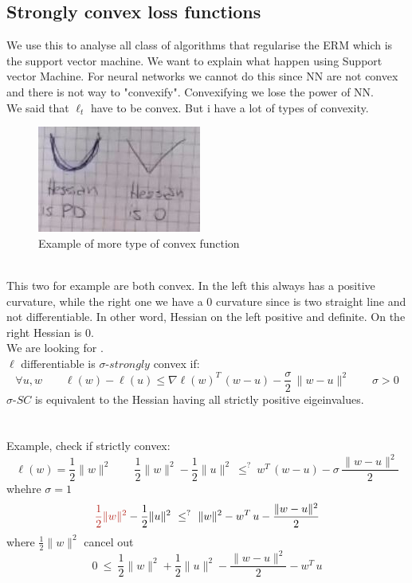 \documentclass[../main.tex]{subfiles}
\begin{document}
\subsection{Strongly convex loss functions}
We use this to analyse all class of algorithms that regularise the ERM which is the support vector machine. We want to explain what happen using Support vector Machine. For neural networks we cannot do this since NN are not convex and there is not way to "convexify". Convexifying we lose the power of NN.
\\
We said that $\ell_t$ have to be convex. But i have a lot of types of convexity.
\\
\begin{figure}[h]
    \centering
    \includegraphics[width=0.4\linewidth]{../img/lez16-img4.JPG}
    \caption{Example of more type of convex function}
\end{figure}\\
This two for example are both convex. In the left this always has a positive curvature, while the right one we have a 0 curvature since is two straight line and not differentiable.
In other word, Hessian on the left positive and definite. On the right Hessian is 0.
\\
We are looking for .
\\
$\ell$ differentiable is $\sigma$-$strongly$ convex if:
$$
\forall u,w \qquad \ell(w) - \ell(u) \leq \nabla \ell(w)^T \, (w-u) - \frac{\sigma}{2}
 \, \| w-u\|^2 \qquad \sigma > 0$$
$\sigma$-$SC$ is equivalent to the Hessian having all strictly positive eigeinvalues.
\\\\\\
Example, check if strictly convex:
\\
$$
\ell(w) = \frac{1}{2} \| w\|^2 \qquad \frac{1}{2} \| w\|^2 - \frac{1}{2} \| u\|^2   \ \leq^? \ w^T \, (w-u) - \sigma \, \frac{\| w-u\|^2}{2} 
$$
whehre $\sigma = 1$
$$
\red{\frac{1}{2} \| w \|^2 }- \frac{1}{2} \|u\|^2 \ \leq^? \ \|w\|^2 - w^T \, u - \frac{\| w-u\|^2}{2}  $$
where $\frac{1}{2} \| w \|^2 $ cancel out
$$
0 \ \leq \ \frac{1}{2} \| w\|^2 + \frac{1}{2} \|u\|^2 - \frac{\| w-u\|^2}{2} - w^T \, u
$$
\end{document}
